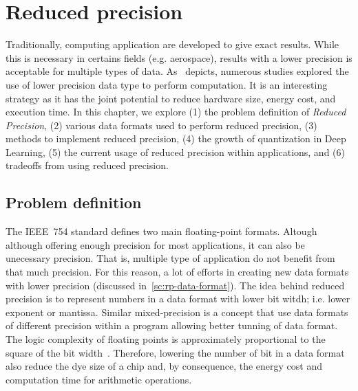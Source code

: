 \chapter{Reduced precision}
\label{ch:reduced-precision}
Traditionally, computing application are developed to give exact results.
While this is necessary in certains fields (e.g. aerospace), results with a lower
precision is acceptable for multiple types of data.
As~\cite{Cherubin2020-tt} depicts, numerous studies explored the use of lower 
precision data type to perform computation.
It is an interesting strategy as it has the joint potential to reduce hardware 
size, energy cost, and execution time.
In this chapter, we explore (1) the problem definition of \textit{Reduced Precision},
(2) various data formats used to perform reduced precision,
(3) methods to implement reduced precision,
(4) the growth of quantization in Deep Learning,
(5) the current usage of reduced precision within applications,
and (6) tradeoffs from using reduced precision.

\section{Problem definition}
\label{sc:rp-problem-definiton}
The IEEE~754 standard defines two main floating-point formats.
Altough although offering enough precision for most applications, it can also be unecessary precision.
That is, multiple type of application do not benefit from that much precision.
For this reason, a lot of efforts in creating new data formats with lower precision (discussed in~\ref{sc:rp-data-format}).
The idea behind reduced precision is to represent numbers in a data format with 
lower bit witdh; i.e. lower exponent or mantissa.
Similar mixed-precision is a concept that use data formats of different precision within a program allowing better tunning of data format.
The logic complexity of floating points is approximately proportional to the square of the bit width~\cite{Chen2018-an}.
Therefore, lowering the number of bit in a data format also reduce the dye size 
of a chip and, by consequence, the energy cost and computation time for arithmetic operations.

